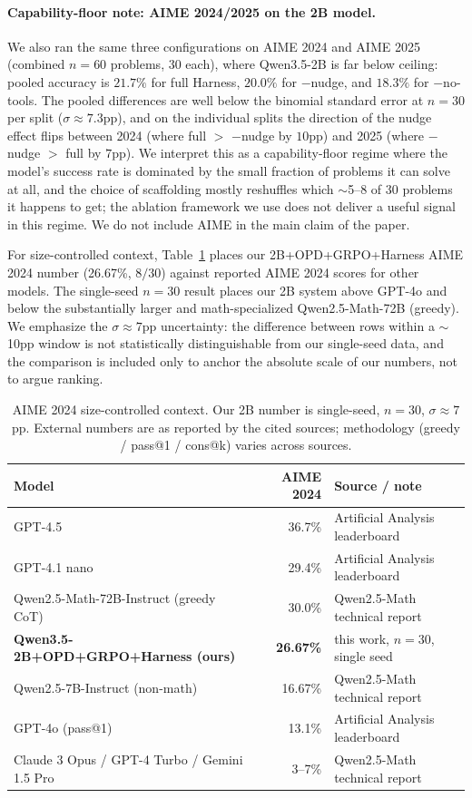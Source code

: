 \documentclass[10pt]{article}
\begin{document}
\paragraph{Capability-floor note: AIME 2024/2025 on the 2B model.} We also ran the same three configurations on AIME 2024 and AIME 2025 (combined $n{=}60$ problems, $30$ each), where Qwen3.5-2B is far below ceiling: pooled accuracy is $21.7\%$ for full Harness, $20.0\%$ for $-$nudge, and $18.3\%$ for $-$no-tools. The pooled differences are well below the binomial standard error at $n{=}30$ per split ($\sigma \approx 7.3$pp), and on the individual splits the direction of the nudge effect flips between 2024 (where full $>$ $-$nudge by $10$pp) and 2025 (where $-$nudge $>$ full by $7$pp). We interpret this as a capability-floor regime where the model's success rate is dominated by the small fraction of problems it can solve at all, and the choice of scaffolding mostly reshuffles which $\sim$5--8 of 30 problems it happens to get; the ablation framework we use does not deliver a useful signal in this regime. We do not include AIME in the main claim of the paper.

For size-controlled context, Table~\ref{tab:aime-context} places our 2B+OPD+GRPO+Harness AIME 2024 number (26.67\%, $8/30$) against reported AIME 2024 scores for other models. The single-seed $n{=}30$ result places our 2B system above GPT-4o and below the substantially larger and math-specialized Qwen2.5-Math-72B (greedy). We emphasize the $\sigma \approx 7$pp uncertainty: the difference between rows within a $\sim$10pp window is not statistically distinguishable from our single-seed data, and the comparison is included only to anchor the absolute scale of our numbers, not to argue ranking.

\begin{table}[h]
\centering
\caption{AIME 2024 size-controlled context. Our 2B number is single-seed, $n{=}30$, $\sigma{\approx}7$pp. External numbers are as reported by the cited sources; methodology (greedy / pass@1 / cons@k) varies across sources.}
\label{tab:aime-context}
\begin{tabular}{lrl}
\toprule
Model & AIME 2024 & Source / note \\
\midrule
GPT-4.5 & 36.7\% & Artificial Analysis leaderboard \\
GPT-4.1 nano & 29.4\% & Artificial Analysis leaderboard \\
Qwen2.5-Math-72B-Instruct (greedy CoT) & 30.0\% & Qwen2.5-Math technical report \\
\textbf{Qwen3.5-2B+OPD+GRPO+Harness (ours)} & \textbf{26.67\%} & this work, $n{=}30$, single seed \\
Qwen2.5-7B-Instruct (non-math) & 16.67\% & Qwen2.5-Math technical report \\
GPT-4o (pass@1) & 13.1\% & Artificial Analysis leaderboard \\
Claude 3 Opus / GPT-4 Turbo / Gemini 1.5 Pro & 3--7\% & Qwen2.5-Math technical report \\
\bottomrule
\end{tabular}
\end{table}
\end{document}
